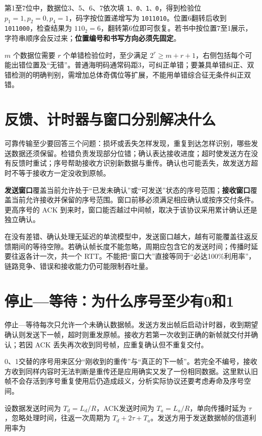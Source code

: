 第1至7位中，数据位3、5、6、7依次填 \texttt{1、0、1、0}，得到检验位 \(p_1=1,p_2=0,p_4=1\)，码字按位置递增写为 \texttt{1011010}。位置6翻转后收到 \texttt{1011000}，检查结果为 \(110_2=6\)，翻转第6位即可恢复。若书中按位置7至1展示，字符串顺序会反过来；\textbf{位置编号和书写方向必须先固定}。

\(m\) 个数据位需要 \(r\) 个单错检验位时，至少满足 \(2^r\ge m+r+1\)，右侧包括每个可能出错位置及``无错''。普通海明码通常码距3，可纠正单错；要兼具单错纠正、双错检测的明确判别，需增加总体奇偶位等扩展，不能用单错综合征无条件纠正双错。

\section{反馈、计时器与窗口分别解决什么}\label{CN03-05}

可靠传输至少要回答三个问题：损坏或丢失怎样发现，重复到达怎样识别，哪些发送数据还须保留。检错负责发现部分位错；确认表达接收进度；超时使发送方在没有反馈时重试；序号帮助接收方识别新数据与重传。确认也可能丢失，故发送方超时不等于接收方一定没收到原帧。

\textbf{发送窗口}覆盖当前允许处于``已发未确认''或``可发送''状态的序号范围；\textbf{接收窗口}覆盖当前允许接收并保留的序号范围。窗口前移必须满足相应确认或按序交付条件。更高序号的 ACK 到来时，窗口能否越过中间帧，取决于该协议采用累计确认还是独立确认。

在没有差错、确认处理无延迟的单流模型中，发送窗口越大，越有可能覆盖往返反馈期间的等待空隙。若确认帧长度不能忽略，周期应包含它的发送时间；传播时延要往返各计一次，共一个 RTT。不能把``窗口大''直接等同于``必达100\%利用率''，链路竞争、错误和接收能力仍可能限制吞吐量。

\section{停止---等待：为什么序号至少有0和1}\label{CN03-06}

停止---等待每次只允许一个未确认数据帧。发送方发出帧后启动计时器，收到期望确认则发送下一帧，超时则重发原帧。接收方若第一次收到正确的新帧就交付并确认；若因 ACK 丢失再次收到同号帧，应重复确认但不重复交付。

0、1交替的序号用来区分``刚收到的重传''与``真正的下一帧''。若完全不编号，接收方收到同样内容时无法判断是重传还是应用确实又发了一份相同数据。这里默认旧帧不会存活到序号重复使用后仍造成歧义，分析实际协议还要考虑寿命及序号空间。

设数据发送时间为 \(T_d=L_d/R\)，ACK发送时间为 \(T_a=L_a/R\)，单向传播时延为 \(\tau\)，忽略处理时间，往返一次周期为 \(T_d+2\tau+T_a\)。发送方用于发送数据帧的信道利用率为

